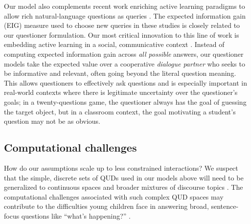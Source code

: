 \documentclass[11pt, floatsintext]{apa6}
\begin{document}
Our model also complements recent work enriching active learning paradigms to allow rich natural-language questions as queries \cite{RotheEtAl16_NaturalLanguageQuestions, CohenLake16_20Q}. 
The expected information gain (EIG) measure used to choose new queries in these studies is closely related to our questioner formulation. 
Our most critical innovation to this line of work is embedding active learning in a social, communicative context \cite<see also>{ShaftoGoodmanFrank12_LearningFromOthers, ShaftoGoodmanGriffiths14_Pedagogical}. 
Instead of computing expected information gain across \emph{all possible} answers, our questioner models take the expected value over a cooperative \emph{dialogue partner} who seeks to be informative and relevant, often going beyond the literal question meaning. 
This allows questioners to effectively ask questions and is especially important in real-world contexts where there is legitimate uncertainty over the questioner's goals; in a twenty-questions game, the questioner always has the goal of guessing the target object, but in a classroom context, the goal motivating a student's question may not be as obvious.


\subsection{Computational challenges}

How do our assumptions scale up to less constrained interactions? 
We suspect that the simple, discrete sets of QUDs used in our models above will need to be generalized to continuous spaces and broader mixtures of discourse topics \cite{BleiNgJordan03_LDA, GriffithsSteyversTenenbaum07_Topics}. 
The computational challenges associated with such complex QUD spaces may contribute to the difficulties young children face in answering broad, sentence-focus questions like ``what's happening?'' \cite{SalomoLievenTomasello13_ChildrenAnsweringQuestions}. 
\end{document}
